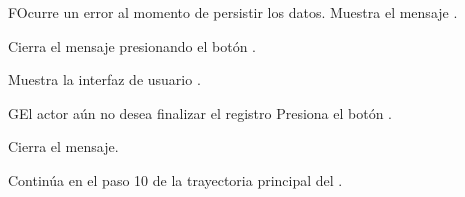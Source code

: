 \begin{UCtrayectoriaA}{F}{Ocurre un error al momento de persistir los datos.}
	\UCpaso Muestra el mensaje .
	
	\UCpaso[\UCactor] Cierra el mensaje presionando el botón .
	
	\UCpaso Muestra la interfaz de usuario .
\end{UCtrayectoriaA}

\begin{UCtrayectoriaA}{G}{El actor aún no desea finalizar el registro}
	\UCpaso[\UCactor] Presiona el botón .
	
	\UCpaso Cierra el mensaje.
	
	\UCpaso Continúa en el paso 10 de la trayectoria principal del .
\end{UCtrayectoriaA}